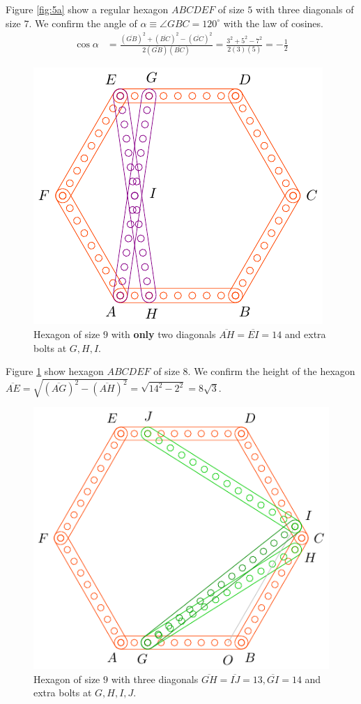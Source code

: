 \documentclass[11pt]{article}
\begin{document}
Figure \ref{fig:5a} show a regular hexagon $ABCDEF$ of size $5$ with three diagonals of size $7$. We confirm the angle of $\alpha \equiv \angle{GBC} = 120^\circ$ with the law of cosines.
\begin{align}
\cos\alpha &= \frac{(\overline{GB})^2 + (\overline{BC})^2 - (\overline{GC})^2}
 {2(\overline{GB})(\overline{BC})}
 = \frac{3^2 + 5^2 - 7^2}{2(3)(5)} = -\frac{1}2 \nonumber
\end{align}

\begin{figure}[H]
\centering
\includegraphics[scale=1]{8/hexa-8a}
\caption{Hexagon of size $9$ with \textbf{only} two diagonals $\overline{AH} = \overline{EI} = 14$ and extra bolts at $G,H,I$.}
\label{fig:8a}
\end{figure}

Figure \ref{fig:8a} show hexagon $ABCDEF$ of size $8$. We confirm the height of the hexagon $\overline{AE} = \sqrt{(\overline{AG})^2 - (\overline{AH})^2} = \sqrt{14^2 - 2^2} = 8\sqrt3$.


\begin{figure}[H]
\centering
\includegraphics[scale=1]{9/hexa-9a}
\caption{Hexagon of size $9$ with three diagonals $\overline{GH} = \overline{IJ} = 13, \overline{GI} = 14$ and extra bolts at $G,H,I,J$.}
\label{fig:9a}
\end{figure}
\end{document}
